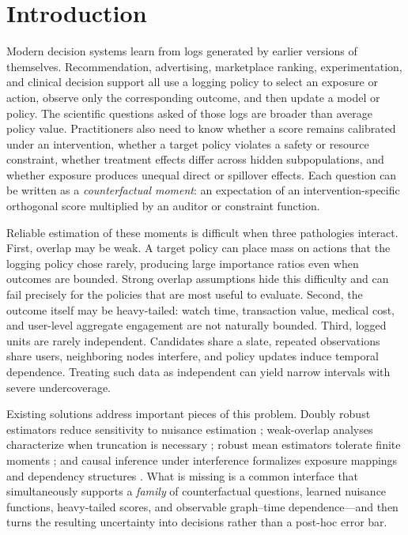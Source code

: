 \section{Introduction}
\label{sec:intro}

Modern decision systems learn from logs generated by earlier versions of themselves. Recommendation, advertising, marketplace ranking, experimentation, and clinical decision support all use a logging policy to select an exposure or action, observe only the corresponding outcome, and then update a model or policy. The scientific questions asked of those logs are broader than average policy value. Practitioners also need to know whether a score remains calibrated under an intervention, whether a target policy violates a safety or resource constraint, whether treatment effects differ across hidden subpopulations, and whether exposure produces unequal direct or spillover effects. Each question can be written as a \emph{counterfactual moment}: an expectation of an intervention-specific orthogonal score multiplied by an auditor or constraint function.

Reliable estimation of these moments is difficult when three pathologies interact. First, overlap may be weak. A target policy can place mass on actions that the logging policy chose rarely, producing large importance ratios even when outcomes are bounded. Strong overlap assumptions hide this difficulty and can fail precisely for the policies that are most useful to evaluate. Second, the outcome itself may be heavy-tailed: watch time, transaction value, medical cost, and user-level aggregate engagement are not naturally bounded. Third, logged units are rarely independent. Candidates share a slate, repeated observations share users, neighboring nodes interfere, and policy updates induce temporal dependence. Treating such data as independent can yield narrow intervals with severe undercoverage.

Existing solutions address important pieces of this problem. Doubly robust estimators reduce sensitivity to nuisance estimation \citep{dudik2011doubly,jiang2016doubly,farajtabar2018more}; weak-overlap analyses characterize when truncation is necessary \citep{wang2017optimal,mehrabi2024weak,khan2024beyond}; robust mean estimators tolerate finite moments \citep{lugosi2019mean}; and causal inference under interference formalizes exposure mappings and dependency structures \citep{aronow2017estimating,savje2021average}. What is missing is a common interface that simultaneously supports a \emph{family} of counterfactual questions, learned nuisance functions, heavy-tailed scores, and observable graph--time dependence---and then turns the resulting uncertainty into decisions rather than a post-hoc error bar.

